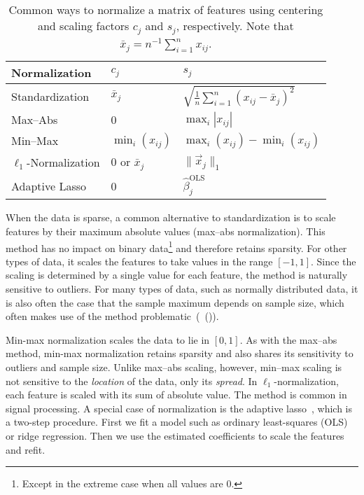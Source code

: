 \begin{table}[hbt]
  \centering
  \caption{
    Common ways to normalize a matrix of features using centering and scaling
    factors \(c_j\) and \(s_j\), respectively. Note that \(\bar{x}_j =
    n^{-1}\sum_{i=1}^n x_{ij}\).
  }
  \label{tab:normalization-types}
  \vskip 0.15in
  \small
  \begin{tabular}{lll}
    \toprule
    Normalization            & \(c_{j}\)          & \(s_j\)                                                   \\
    \midrule
    Standardization          & \(\bar{x}_j\)      & \(\sqrt{\frac{1}{n}\sum_{i=1}^n (x_{ij} - \bar{x}_j)^2}\) \\
    \addlinespace
    Max--Abs                 & 0                  & \(\max_i|x_{ij}|\)                                        \\
    \addlinespace
    Min--Max                 & \(\min_i(x_{ij})\) & \(\max_i(x_{ij}) - \min_i(x_{ij})\)                       \\
    \addlinespace
    \(\ell_1\)-Normalization & 0 or \(\bar{x}_j\) & \(\lVert \vec{x}_j\rVert_1\)                              \\
    \addlinespace
    Adaptive Lasso           & 0                  & \(\hat{\beta}_j^\text{OLS}\)                              \\
    \bottomrule
  \end{tabular}
\end{table}

When the data is sparse, a common alternative to standardization is to scale features by
their maximum absolute values (max--abs normalization). This method has no impact on binary
data\footnote{Except in the extreme case when all values are 0.} and therefore retains
sparsity. For other types of data, it scales the features to take values in the range
\([-1, 1]\). Since the scaling is determined by a single value for each feature, the method
is naturally sensitive to outliers. For many types of data, such as normally distributed
data, it is also often the case that the sample maximum depends on sample size, which often
makes use of the method problematic~(~()).

Min-max normalization scales the data to lie in \([0, 1]\). As with the max--abs method,
min-max normalization retains sparsity and also shares its sensitivity to outliers and
sample size. Unlike max--abs scaling, however, min--max scaling is not sensitive to the
\emph{location} of the data, only its \emph{spread}. In \(\ell_1\)-normalization, each
feature is scaled with its sum of absolute value. The method is common in signal
processing. A special case of normalization is the adaptive lasso~\citep{zou2006}, which is
a two-step procedure. First we fit a model such as ordinary least-squares (OLS) or ridge
regression. Then we use the estimated coefficients to scale the features and refit.

